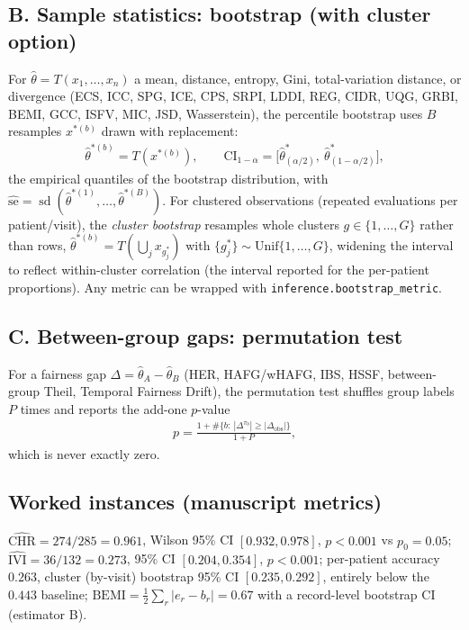 \documentclass[11pt]{article}
\begin{document}
\subsection{B. Sample statistics: bootstrap (with cluster option)}

For $\hat\theta=T(x_1,\dots,x_n)$ a mean, distance, entropy, Gini,
total-variation distance, or divergence (ECS, ICC, SPG, ICE, CPS, SRPI, LDDI,
REG, CIDR, UQG, GRBI, BEMI, GCC, ISFV, MIC, JSD, Wasserstein), the percentile
bootstrap uses $B$ resamples $x^{\ast(b)}$ drawn with replacement:
\begin{align}
\hat\theta^{\ast(b)}=T(x^{\ast(b)}),\qquad
\mathrm{CI}_{1-\alpha}=\big[\hat\theta^{\ast}_{(\alpha/2)},\ \hat\theta^{\ast}_{(1-\alpha/2)}\big],
\end{align}
the empirical quantiles of the bootstrap distribution, with
$\widehat{\mathrm{se}}=\operatorname{sd}(\hat\theta^{\ast(1)},\dots,\hat\theta^{\ast(B)})$.
For clustered observations (repeated evaluations per patient/visit), the
\emph{cluster bootstrap} resamples whole clusters $g\in\{1,\dots,G\}$ rather than
rows, $\hat\theta^{\ast(b)}=T(\bigcup_j x_{g_j^{\ast}})$ with
$\{g_j^{\ast}\}\sim\mathrm{Unif}\{1,\dots,G\}$, widening the interval to reflect
within-cluster correlation (the interval reported for the per-patient
proportions). Any metric can be wrapped with
\texttt{inference.bootstrap\_metric}.

\subsection{C. Between-group gaps: permutation test}

For a fairness gap $\Delta=\hat\theta_A-\hat\theta_B$ (HER, HAFG/wHAFG, IBS,
HSSF, between-group Theil, Temporal Fairness Drift), the permutation test
shuffles group labels $P$ times and reports the add-one $p$-value
\begin{align}
p=\frac{1+\#\{b:\ |\Delta^{\pi_b}|\ge|\Delta_{\mathrm{obs}}|\}}{1+P},
\end{align}
which is never exactly zero.

\subsection{Worked instances (manuscript metrics)}
$\widehat{\mathrm{CHR}}=274/285=0.961$, Wilson 95\% CI $[0.932,0.978]$, $p<0.001$
vs $p_0=0.05$;\quad
$\widehat{\mathrm{IVI}}=36/132=0.273$, 95\% CI $[0.204,0.354]$, $p<0.001$;\quad
per-patient accuracy $0.263$, cluster (by-visit) bootstrap 95\% CI
$[0.235,0.292]$, entirely below the $0.443$ baseline;\quad
$\mathrm{BEMI}=\tfrac12\sum_r|e_r-b_r|=0.67$ with a record-level bootstrap CI
(estimator B).
\end{document}
